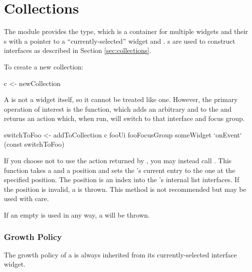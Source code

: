 \section{Collections}

The  module provides the  type, which is
a container for multiple widgets and their s with a
pointer to a ``currently-selected'' widget and .
s are used to construct interfaces as described in
Section \ref{sec:collections}.

To create a new collection:

\begin{haskellcode}
 c <- newCollection
\end{haskellcode}

A  is not a widget itself, so it cannot be treated like
one.  However, the primary operation of interest is the
 function, which adds an arbitrary 
and  to the  and returns an 
action which, when run, will switch to that interface and focus group.

\begin{haskellcode}
 switchToFoo <- addToCollection c fooUi fooFocusGroup
 someWidget `onEvent` (const switchToFoo)
\end{haskellcode}

If you choose not to use the  action returned by
, you may instead call .  This
function takes a  and a position and sets the
's current entry to the one at the specified position.
The position is an index into the 's internal list
interfaces.  If the position is invalid, a  is
thrown.  This method is not recommended but may be used with care.


If an empty  is used in any way, a 
will be thrown.

\subsubsection{Growth Policy}

The growth policy of a  is always inherited from its
currently-selected interface widget.

